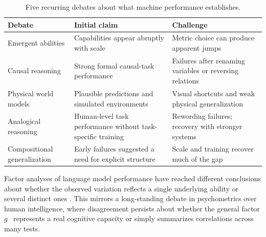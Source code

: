 \documentclass[acmsmall,screen,review,anonymous]{acmart}
\begin{document}
\begin{table}[t]
\caption{Five recurring debates about what machine performance establishes.}
\label{tab:dialectic}
\centering
\small
\setlength{\tabcolsep}{6pt}
\renewcommand{\arraystretch}{1.15}
\begin{tabularx}{\textwidth}{p{} Y Y}
\toprule
Debate & Initial claim & Challenge \\
\midrule
Emergent abilities &
Capabilities appear abruptly with scale~\citep{wei2022emergent, srivastava2023beyond} &
Metric choice can produce apparent jumps~\citep{schaeffer2023emergent} \\
\addlinespace
Causal reasoning &
Strong formal causal-task performance~\citep{jin2023cladder,kiciman2024causal} &
Failures after renaming variables or reversing relations~\citep{jin2024largelanguagemodelsinfer,joshi-etal-2024-llms} \\
\addlinespace
Physical world models &
Plausible predictions and simulated environments~\citep{ha2018recurrentworld,hafner2020dreamcontrollearningbehaviors,bruce2024geniegenerativeinteractiveenvironments} &
Visual shortcuts and weak physical generalization~\citep{kang2025how,chow2025physbenchbenchmarkingenhancingvisionlanguage,bansal2026videophy,tung2023physion} \\
\addlinespace
Analogical reasoning &
Human-level task performance without task-specific training~\citep{Webb2022EmergentAR} &
Rewording failures; recovery with stronger systems~\citep{hodel2024responseemergentanalogicalreasoning,lewis2024usingcounterfactualtasksevaluate,webb2025evidence} \\
\addlinespace
Compositional generalization &
Early failures suggested a need for explicit structure~\citep{lake2018compskill,keysers2020measuringcompositionalgeneralizationcomprehensive,kim-linzen-2020-cogs,bahdanau2020closureassessingsystematicgeneralization} &
Scale and training recover much of the gap~\citep{csordas2021devil,ontanon2022making,Lake2023-ut} \\
\bottomrule
\end{tabularx}
\end{table}

Factor analyses of language model performance have reached different conclusions about whether the observed variation reflects a single underlying ability or several distinct ones \citep{burnell2023revealingstructurelanguagemodel, ye2026largelanguagemodelpsychometrics}.
%
This mirrors a long-standing debate in psychometrics over human intelligence, where disagreement persists about whether the general factor $g$~\citep{spearman1904} represents a real cognitive capacity or simply summarizes correlations across many tests.
\end{document}
